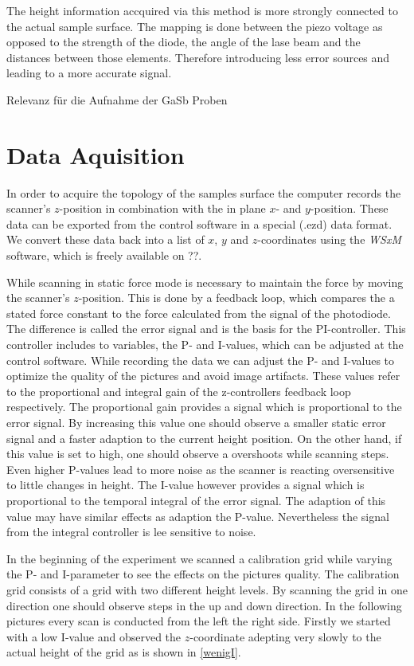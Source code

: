 \documentclass[paper=a4,fontsize=10pt,DIV=18,twocolumn,parskip=half]{scrartcl}
\numberwithin{equation}{section}    %
\begin{document}
The height information accquired via this method is more strongly connected to 
the actual sample surface. The mapping is done between the piezo voltage as 
opposed to the strength of the diode, the angle of the lase beam and the 
distances between those elements. Therefore introducing less error sources and 
leading to a more accurate signal.

%
Relevanz für die Aufnahme der GaSb Proben\\
%

\section{Data Aquisition}
\label{dataaquisition}
In order to acquire the topology of the samples surface the computer records the scanner's $z$-position in combination with the in plane $x$- and $y$-position. These data can be exported from the control software in a special (.ezd) data format. We convert these data back into a list of $x$, $y$ and $z$-coordinates using the \textit{WSxM} software, which is freely available on ??. 

While scanning in static force mode is necessary to maintain the force by moving the scanner's $z$-position. This is done by a feedback loop, which compares the a stated force constant to the force calculated from the signal of the photodiode. The difference is called the error signal and is the basis for the PI-controller. This controller includes to variables, the P- and I-values, which can be adjusted at the control software.
While recording the data we can adjust the P- and I-values to optimize the quality of the pictures and avoid image artifacts. These values refer to the proportional and integral gain of the z-controllers feedback loop respectively. The proportional gain provides a signal which is proportional to the error signal. By increasing this value one should observe a smaller static error signal and a faster adaption to the current height position.
On the other hand, if this value is set to high, one should observe a overshoots while scanning steps. Even higher P-values lead to more noise as the scanner is reacting oversensitive to little changes in height. The I-value however provides a signal which is proportional to the temporal integral of the error signal. The adaption of this value may have similar effects as adaption the P-value. Nevertheless the signal from the integral controller is lee sensitive to noise.

In the beginning of the experiment we scanned a calibration grid while varying the P- and I-parameter to see the effects on the pictures quality. The calibration grid consists of a grid with two different height levels. By scanning the grid in one direction one should observe steps in the up and down direction. In the following pictures every scan is conducted from the left the right side. Firstly we started with a low I-value and observed the $z$-coordinate adepting very slowly to the actual height of the grid as is shown in \ref{wenigI}.
\end{document}
